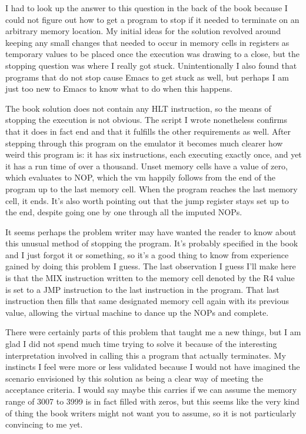 \documentclass{article}
\begin{document}
I had to look up the answer to this question in the back of the book because
I could not figure out how to get a program to stop if it needed to terminate
on an arbitrary memory location. My initial ideas for the solution revolved
around keeping any small changes that needed to occur in memory cells in
registers as temporary values to be placed once the execution was drawing
to a close, but the stopping question was where I really got stuck. Unintentionally
I also found that programs that do not stop cause Emacs to get stuck as well,
but perhaps I am just too new to Emacs to know what to do when this happens.

\par

The book solution does not contain any HLT instruction, so the means of stopping
the execution is not obvious.  The script I wrote nonetheless confirms that it
does in fact end and that it fulfills the other requirements as well.  After stepping through
this program on the emulator it becomes much clearer how weird this program is:
it has six instructions, each executing exactly once, and yet it has a run time 
of over a thousand.  Unset memory cells have a value of zero, which evaluates to
NOP, which the vm happily follows from the end of the program up to the last
memory cell.  When the program reaches the last memory cell, it ends.  It's also
worth pointing out that the jump register stays set up to the end, despite going
one by one through all the imputed NOPs.

\par

It seems perhaps the problem writer may have wanted the reader to know about this 
unusual method of stopping the program.  It's probably specified in the book and
I just forgot it or something, so it's a good thing to know from experience gained
by doing this problem I guess.  The last observation I guess I'll make here is
that the MIX instruction written to the memory cell denoted by the R4 value is set
to a JMP instruction to the last instruction in the program.  That last instruction 
then fills that same designated memory cell again with its previous value, allowing
the virtual machine to dance up the NOPs and complete.

\par

There were certainly parts of this problem that taught me a new things, but I am glad I
did not spend much time trying to solve it because of the interesting interpretation
involved in calling this a program that actually terminates.  My instincts I feel
were more or less validated because I would not have imagined the scenario envisioned
by this solution as being a clear way of meeting the acceptance criteria.  I would say
maybe this carries if we can assume the memory range of 3007 to 3999 is in fact filled
with zeros, but this seems like the very kind of thing the book writers might not want
you to assume, so it is not particularly convincing to me yet.
\end{document}
